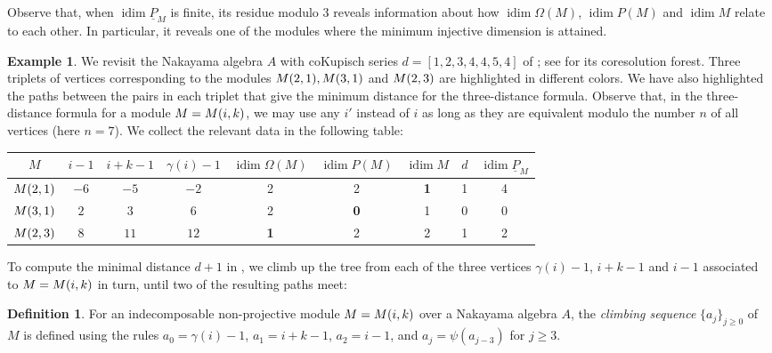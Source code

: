 \documentclass[a4paper]{amsart}
\theoremstyle{definition}
\newtheorem{definition}[theorem]{Definition}
\newtheorem{example}[theorem]{Example}
\theoremstyle{remark}
\numberwithin{equation}{theorem}
\newcommand{\Dfn}[1]{\emph{\color{blue}#1}} %
\newcommand{\pstab}[1]{\underline{P}_{#1}}
\newcommand{\idim}{\operatorname{idim}}
\begin{document}
Observe that, when $ \idim \pstab M$ is finite, its residue modulo $ 3 $ reveals information about how $ \idim \Omega(M)$, $ \idim P(M) $ and $ \idim M $ relate to each other. In particular, it reveals one of the modules where the minimum injective dimension is attained.

\begin{example}\label{ex:3.dist.form}
  We revisit the Nakayama algebra $ A $ with coKupisch series $d = [1,2,3,4,4,5,4]$ of ; see  for its coresolution forest.
  Three triplets of vertices corresponding to the modules $ \mik[2][1] , \mik[3][1] $ and $ \mik[2][3] $ are highlighted in different colors.
  We have also highlighted the paths between the pairs in each triplet that give the minimum distance for the three-distance formula.
  Observe that, in the three-distance formula for a module $ M = \mik $, we may use any $ i' $ instead of $ i $ as long as they are equivalent modulo the number $ n $ of all vertices (here $ n = 7 $).
  We collect the relevant data in the following table:
  \smallskip
  \begin{center}
    {\small\setlength{\tabcolsep}{4pt}
    \begin{tabular}{c|ccc|ccc|c|c}
      $M$ & $i-1$ & $i+k-1$ & $\gamma(i)-1$ & $\idim \Omega(M)$ & $\idim P(M)$ & $\idim M$ & $d$ & $\idim \pstab{M}$ \\
      \hline
      $\mik[2][1]$ & $-6$ & $-5$ & $-2$ & 2 & 2 & \textbf{1} & 1 & 4 \\
      $\mik[3][1]$ & $2$  & $3$  & $6$  & 2 & \textbf{0} & 1 & 0 & 0 \\
      $\mik[2][3]$ & $8$  & $11$ & $12$ & \textbf{1} & 2 & 2 & 1 & 2 \\
    \end{tabular}}
  \end{center}
\end{example}

To compute the minimal distance $ d+1 $ in , we climb up the tree from each of the three vertices $\gamma(i)-1$, $i+k-1$ and $i-1$ associated to $ M = \mik $ in turn, until two of the resulting paths meet:
\begin{definition}
    For an indecomposable non-projective module $M = \mik$ over a Nakayama algebra $A$, the \Dfn{climbing sequence} $\{a_j\}_{j \geq 0}$ of $M$ is defined using the rules $a_0 = \gamma(i) - 1$, $a_1 = i + k - 1$, $a_2 = i - 1$, and $a_j = \psi(a_{j - 3})$ for $j \geq 3$.
\end{definition}
\end{document}
